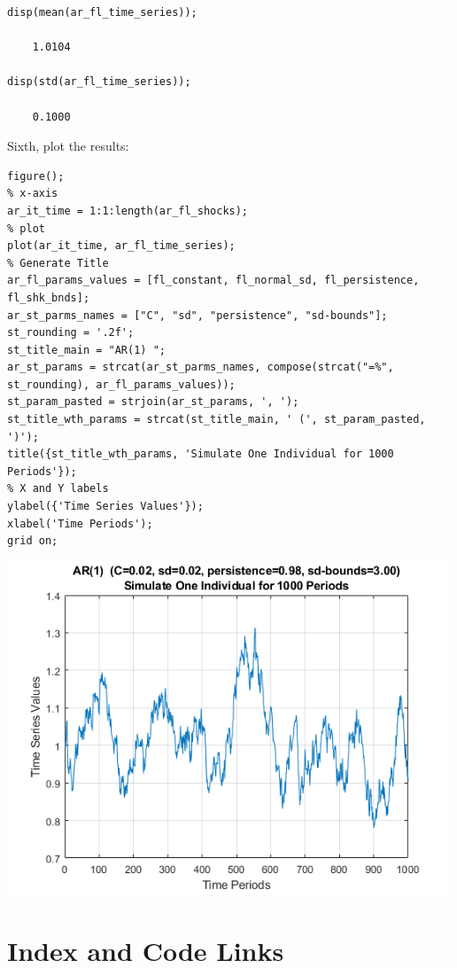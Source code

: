 \documentclass[
]{book}
\begin{document}
\begin{verbatim}
disp(mean(ar_fl_time_series));

    1.0104

disp(std(ar_fl_time_series));

    0.1000
\end{verbatim}

Sixth, plot the results:

\begin{verbatim}
figure();
% x-axis
ar_it_time = 1:1:length(ar_fl_shocks);
% plot
plot(ar_it_time, ar_fl_time_series);
% Generate Title
ar_fl_params_values = [fl_constant, fl_normal_sd, fl_persistence, fl_shk_bnds];
ar_st_parms_names = ["C", "sd", "persistence", "sd-bounds"];
st_rounding = '.2f';
st_title_main = "AR(1) ";
ar_st_params = strcat(ar_st_parms_names, compose(strcat("=%", st_rounding), ar_fl_params_values));
st_param_pasted = strjoin(ar_st_params, ', ');
st_title_wth_params = strcat(st_title_main, ' (', st_param_pasted, ')');
title({st_title_wth_params, 'Simulate One Individual for 1000 Periods'});
% X and Y labels
ylabel({'Time Series Values'});
xlabel('Time Periods');
grid on;
\end{verbatim}

\includegraphics[width=5.20833in,height=\textheight]{img/fs_autoregressive_images/figure_0.png}

\hypertarget{appendix-appendix}{%
\appendix}


\hypertarget{index-and-code-links}{%
\chapter{Index and Code Links}\label{index-and-code-links}}
\end{document}
